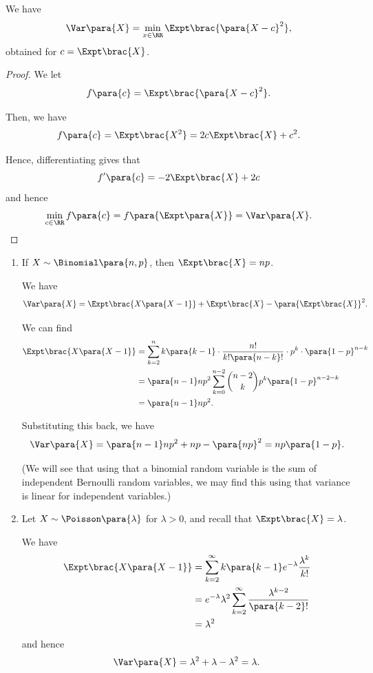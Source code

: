 \begin{proposition}
    \label{prop:variance-minimalisation}%
    We have
    \[
        \Var\para{X} = \min_{x \in \RR} \Expt\brac{\para{X - c}^2},
    \]
    obtained for \(c = \Expt\brac{X}\).
\end{proposition}

\begin{proof}
    We let
    \[
        f\para{c} = \Expt\brac{\para{X - c}^2}.
    \]

    Then, we have
    \[
        f\para{c} = \Expt\brac{X^2} = 2c \Expt\brac{X} + c^2.
    \]

    Hence, differentiating gives that
    \[
        f'\para{c} = -2 \Expt\brac{X} + 2c
    \]
    and hence
    \[
        \min_{c \in \RR} f\para{c} = f\para{\Expt\para{X}} = \Var\para{X}.
    \]
\end{proof}

\begin{examples}
    \label{ex:variance-rv}%
    \begin{enumerate}
        \item If \(X \sim \Binomial\para{n, p}\), then \(\Expt\brac{X} = np\).
        
        We have
        \[
            \Var\para{X} = \Expt\brac{X\para{X - 1}} + \Expt\brac{X} - \para{\Expt\brac{X}}^2.
        \]

        We can find
        \begin{align*}
            \Expt\brac{X \para{X - 1}} &= \sum_{k = 2}^{n} k\para{k - 1} \cdot \frac{n!}{k! \para{n - k}!} \cdot p^k \cdot \para{1 - p}^{n - k} \\
            &= \para{n - 1} n p^2 \sum_{k = 0}^{n - 2} \binom{n - 2}{k} p^k \para{1 - p}^{n - 2 - k} \\
            &= \para{n - 1} n p^2.
        \end{align*}

        Substituting this back, we have
        \[
            \Var\para{X} = \para{n - 1} np^2 + np - \para{np}^2 = np \para{1 - p}.
        \]

        (We will see that using that a binomial random variable is the sum of independent Bernoulli random variables, we may find this using that variance is linear for independent variables.)

        \item Let \(X \sim \Poisson\para{\lambda}\) for \(\lambda > 0\), and recall that \(\Expt\brac{X} = \lambda\).
        
        We have
        \begin{align*}
            \Expt\brac{X \para{X - 1}} &= \sum_{k = 2}^{\infty} k \para{k - 1} e^{-\lambda} \frac{\lambda^k}{k!} \\
            &= e^{-\lambda} \lambda^2 \sum_{k = 2}^{\infty} \frac{\lambda^{k - 2}}{\para{k - 2}!} \\
            &= \lambda^2
        \end{align*}
        and hence
        \[
            \Var\para{X} = \lambda^2 + \lambda - \lambda^2 = \lambda.
        \]
    \end{enumerate}
\end{examples}

